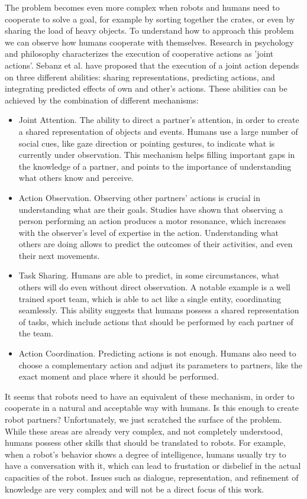 The problem becomes even more complex when robots and humans need to cooperate to solve a goal, for example by sorting together the crates, or even by sharing the load of heavy objects. To understand  how to approach this problem we can observe how humans cooperate with themselves. Research in psychology and philosophy \cite{pacherie2012phenomenology} characterizes the execution of cooperative actions as 'joint actions'. Sebanz et al. \cite{sebanz2006joint} have proposed that the execution of a joint action depends on three different abilities: sharing representations, predicting actions, and integrating predicted effects of own and other's actions. These abilities can be achieved by the combination of different mechanisms:
\begin{itemize}
\item Joint Attention. The ability to direct a partner's attention, in order to create a shared representation of objects and events. Humans use a large number of social cues, like gaze direction or pointing gestures, to indicate what is currently under observation. This mechanism helps filling important gaps in the knowledge of a partner, and points to the importance of understanding what others know and perceive.
\item Action Observation. Observing other partners' actions is crucial in understanding what are their goals. Studies have shown that observing a person performing an action produces a motor resonance, which increases with the observer's level of expertise in the action. Understanding what others are doing allows to predict the outcomes of their activities, and even their next movements.
\item Task Sharing. Humans are able to predict, in some circumstances, what others will do  even without direct observation. A notable example is a well trained sport team, which is able to act like a single entity, coordinating seamlessly. This ability suggests that humans possess a shared representation of tasks, which include actions that should be performed by each partner of the team.
\item Action Coordination. Predicting actions is not enough. Humans also need to choose a complementary action and adjust its parameters to partners, like the exact moment and place where it should be performed. 
\end{itemize}

It seems that robots need to have an equivalent of these mechanism, in order to cooperate in a natural and acceptable way with humans. Is this enough to create robot partners? Unfortunately, we just scratched the surface of the problem. While these areas are already very complex, and not completely understood, humans possess other skills that should be translated to robots. For example, when a robot's behavior shows a degree of intelligence, humans usually try to have a conversation with it, which can lead to frustation or disbelief in the actual capacities of the robot. Issues such as dialogue, representation, and refinement of knowledge are very complex and will not be a direct focus of this work.

